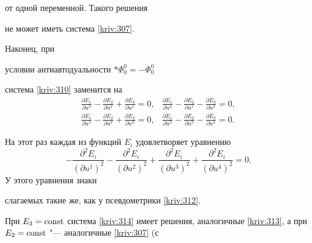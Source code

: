 от одной переменной. Такого решения 

не может иметь система \eqref{kriv:307}.



Наконец, при 

условии антиавтодуальности $\ast \Phi _{0}^{0}=-\Phi _{0}^{0}$ 

система \eqref{kriv:310} заменится на\begin{equation}

\begin{array}{ll}

\displaystyle 

\frac{\partial E_{1}}{\partial u^{3}}-\frac{\partial E_{2}}{\partial u^{2}}+\frac{\partial E_{3}}{\partial u^{1}}=0,& 

\displaystyle 

\frac{\partial E_{1}}{\partial u^{4}}-\frac{\partial E_{2}}{\partial u^{1}}-\frac{\partial E_{3}}{\partial u^{2}}=0, \\[3mm]

\displaystyle 

\frac{\partial E_{1}}{\partial u^{1}}-\frac{\partial E_{2}}{\partial u^{4}}+\frac{\partial E_{3}}{\partial u^{3}}=0, & 

\displaystyle 

\frac{\partial E_{1}}{\partial u^{2}}-\frac{\partial E_{2}}{\partial u^{3}}-\frac{\partial E_{3}}{\partial u^{4}}=0.\end{array}

\label{kriv:314}

\end{equation}

На этот раз каждая из функций $E_{i}$ удовлетворяет уравнению\begin{equation*}

-\frac{\partial ^{2}E_{i}}{\left( \partial u^{1}\right) ^{2}}-\frac{\partial

^{2}E_{i}}{\left( \partial u^{2}\right) ^{2}}+\frac{\partial ^{2}E_{i}}{\left( \partial u^{3}\right) ^{2}}+\frac{\partial ^{2}E_{i}}{\left( \partial

u^{4}\right) ^{2}}=0.

\end{equation*}У этого уравнения знаки 

слагаемых такие же, как у  псевдометрики \eqref{kriv:312}. 

При $E_{3}= \rm const$ система \eqref{kriv:314} имеет решения, аналогичные \eqref{kriv:313}, а при $E_{2}=\rm const$ "--- аналогичные \eqref{kriv:307} (с

